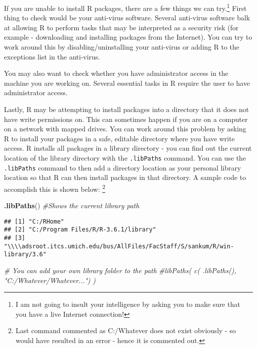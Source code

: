 \documentclass[
]{krantz}
\makeatletter
\newenvironment{Shaded}{\begin{snugshade}}{\end{snugshade}}
\newcommand{\CommentTok}[1]{\textcolor[rgb]{0.37,0.37,0.37}{\textit{#1}}}
\newcommand{\KeywordTok}[1]{\textcolor[rgb]{0.27,0.27,0.27}{\textbf{#1}}}
\newcommand{\NormalTok}[1]{#1}
\newenvironment{kframe}{%
\medskip{}
\setlength{\fboxsep}{.8em}
 \def\at@end@of@kframe{}%
 \ifinner\ifhmode%
  \def\at@end@of@kframe{\end{minipage}}%
  \begin{minipage}{\columnwidth}%
 \fi\fi%
 \def\FrameCommand##1{\hskip\@totalleftmargin \hskip-\fboxsep
 \colorbox{shadecolor}{##1}\hskip-\fboxsep
     \hskip-\linewidth \hskip-\@totalleftmargin \hskip\columnwidth}%
 \MakeFramed {\advance\hsize-\width
   \@totalleftmargin\z@ \linewidth\hsize
   \@setminipage}}%
 {\par\unskip\endMakeFramed%
 \at@end@of@kframe}
\renewenvironment{Shaded}{\begin{kframe}}{\end{kframe}}
\makeatother
\begin{document}
If you are unable to install R packages, there are a few things we can try.\footnote{I am not going to insult your intelligence by asking you to make sure that you have a live Internet connection!} First thing to check would be your anti-virus software. Several anti-virus software balk at allowing R to perform tasks that may be interpreted as a security risk (for example - downloading and installing packages from the Internet). You can try to work around this by disabling/uninstalling your anti-virus or adding R to the exceptions list in the anti-virus.

You may also want to check whether you have administrator access in the machine you are working on. Several essential tasks in R require the user to have administrator access.

Lastly, R may be attempting to install packages into a directory that it does not have write permissions on. This can sometimes happen if you are on a computer on a network with mapped drives. You can work around this problem by asking R to install your packages in a safe, editable directory where you have write access. R installs all packages in a library directory - you can find out the current location of the library directory with the \texttt{.libPaths} command. You can use the \texttt{.libPaths} command to then add a directory location as your personal library location so that R can then install packages in that directory. A sample code to accomplish this is shown below: \footnote{Last command commented as C:/Whatever does not exist obviously - so would have resulted in an error - hence it is commented out.}

\begin{Shaded}
\begin{Highlighting}[]
\KeywordTok{.libPaths}\NormalTok{() }\CommentTok{#Shows the current library path}
\end{Highlighting}
\end{Shaded}

\begin{verbatim}
## [1] "C:/RHome"                                                                   
## [2] "C:/Program Files/R/R-3.6.1/library"                                         
## [3] "\\\\adsroot.itcs.umich.edu/bus/AllFiles/FacStaff/S/sankum/R/win-library/3.6"
\end{verbatim}

\begin{Shaded}
\begin{Highlighting}[]
\CommentTok{# You can add your own library folder to the path}
\CommentTok{#libPaths( c( .libPaths(), "C:/Whatever/Whatever...") )}
\end{Highlighting}
\end{Shaded}
\end{document}
